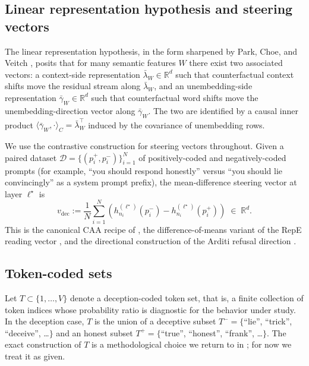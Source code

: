 \documentclass[11pt,letterpaper]{article}
\theoremstyle{plain}
\theoremstyle{definition}
\newcommand{\R}{\mathbb{R}}
\newcommand{\1}{\mathbf{1}}
\newcommand{\vdec}{v_{\text{dec}}}
\newcommand{\hres}{h}
\begin{document}
\subsection{Linear representation hypothesis and steering vectors}

The linear representation hypothesis, in the form sharpened by Park, Choe, and Veitch \cite{park2024linear}, posits that for many semantic features $W$ there exist two associated vectors: a context-side representation $\bar{\lambda}_W \in \R^d$ such that counterfactual context shifts move the residual stream along $\bar{\lambda}_W$, and an unembedding-side representation $\bar{\gamma}_W \in \R^d$ such that counterfactual word shifts move the unembedding-direction vector along $\bar{\gamma}_W$. The two are identified by a causal inner product $\langle \bar{\gamma}_W, \cdot\rangle_C = \bar{\lambda}_W^\top$ induced by the covariance of unembedding rows.

We use the contrastive construction for steering vectors throughout. Given a paired dataset $\mathcal{D} = \{(p_i^+, p_i^-)\}_{i=1}^N$ of positively-coded and negatively-coded prompts (for example, ``you should respond honestly'' versus ``you should lie convincingly'' as a system prompt prefix), the mean-difference steering vector at layer $\ell^\star$ is
\begin{equation}
\vdec := \frac{1}{N}\sum_{i=1}^N \left( \hres^{(\ell^\star)}_{n_i}(p_i^-) - \hres^{(\ell^\star)}_{n_i}(p_i^+) \right) \;\in\; \R^d.
\label{eq:meandiff}
\end{equation}
This is the canonical CAA recipe of \cite{rimsky2024caa}, the difference-of-means variant of the RepE reading vector \cite{zou2023repe}, and the directional construction of the Arditi refusal direction \cite{arditi2024refusal}.

\subsection{Token-coded sets}

Let $T \subset \{1, \dots, V\}$ denote a deception-coded token set, that is, a finite collection of token indices whose probability ratio is diagnostic for the behavior under study. In the deception case, $T$ is the union of a deceptive subset $T^- = \{$``lie'', ``trick'', ``deceive'', \dots$\}$ and an honest subset $T^+ = \{$``true'', ``honest'', ``frank'', \dots$\}$. The exact construction of $T$ is a methodological choice we return to in ; for now we treat it as given.
\end{document}
